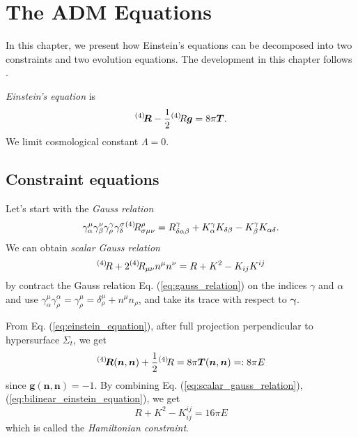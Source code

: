 
\chapter{The ADM Equations} %

\label{Chapter2} %


In this chapter, we present how Einstein's equations can be decomposed into two constraints and two evolution equations. The development in this chapter follows \parencite{gourgoulhon20123+}.

\emph{Einstein's equation} is
\begin{equation}
	\label{eq:einstein_equation}
	{}^{(4)}\hspace{-0.2em} \bm{R} - \frac{1}{2}{}^{(4)}\hspace{-0.2em} R\bm{g} = 8 \pi \bm{T}.
\end{equation}
We limit cosmological constant $\Lambda = 0$.

\section{Constraint equations}

Let's start with the \emph{Gauss relation}
\begin{equation}
	\label{eq:gauss_relation}
	\gamma^\mu _\alpha \gamma ^\nu_\beta \gamma^\gamma_\rho \gamma^\sigma_\delta {}^{(4)}\hspace{-0.2em} R^\rho_{\sigma \mu \nu} = R^\gamma_{\delta\alpha\beta} + K^\gamma_\alpha K_{\delta\beta} - K^\gamma_\beta K_{\alpha\delta}.
\end{equation}
We can obtain \emph{scalar Gauss relation}
\begin{equation}
	\label{eq:scalar_gauss_relation}
	{}^{(4)}\hspace{-0.2em} R + 2 {}^{(4)}\hspace{-0.2em} R_{\mu\nu}n^\mu n^\nu = R + K^2 - K_{ij}K^{ij}
\end{equation}
by contract the Gauss relation Eq. (\ref{eq:gauss_relation}) on the indices $\gamma$ and $\alpha$ and use $\gamma^\mu_\alpha \gamma^\alpha_\rho = \gamma^\mu_\rho=\delta^\mu_\rho+n^\mu n_\rho$, and take its trace with respect to $\bm{\gamma}$.

From Eq. (\ref{eq:einstein_equation}), after full projection perpendicular to hypersurface $\Sigma_t$, we get
\begin{equation}
	\label{eq:bilinear_einstein_equation}
	{}^{(4)}\hspace{-0.2em} \bm{R}(\bm{n}, \bm{n}) + \frac{1}{2}{}^{(4)}\hspace{-0.2em} R = 8\pi \bm{T}(\bm{n}, \bm{n}) =: 8\pi E
\end{equation}
since $\bm{g}(\bm{n}, \bm{n}) = -1$. By combining Eq. (\ref{eq:scalar_gauss_relation}), (\ref{eq:bilinear_einstein_equation}), we get
\begin{equation}
	R+K^2 - K_{ij}^{ij} = 16\pi E
\end{equation}
which is called the \emph{Hamiltonian constraint}.

